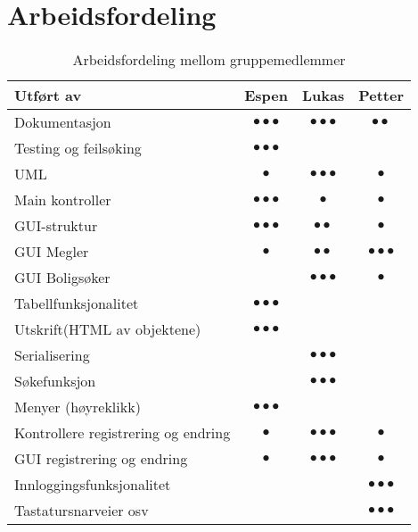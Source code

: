 \section{Arbeidsfordeling}

\begin{table}[ht!]
\center
\caption{Arbeidsfordeling mellom gruppemedlemmer}
\label{tab:arbeidsfordeling}
\begin{tabular}{|p{6.8cm}|c|c|c|}

\hline
Utført av					&Espen&Lukas	&Petter\\ \hline
Dokumentasjon				&$\bullet\bullet\bullet$&$\bullet\bullet\bullet$&$\bullet\bullet$\\	\hline
Testing og feilsøking		&$\bullet\bullet\bullet$&&\\ \hline
UML							&$\bullet$&$\bullet\bullet\bullet$&$\bullet$\\ \hline
Main kontroller				&$\bullet\bullet\bullet$&$\bullet$&$\bullet$\\ \hline
GUI-struktur					&$\bullet\bullet\bullet$&$\bullet\bullet$&$\bullet$\\ \hline
GUI Megler					&$\bullet$&$\bullet\bullet$&$\bullet\bullet\bullet$\\ \hline
GUI Boligsøker				&&$\bullet\bullet\bullet$&$\bullet$\\ \hline
Tabellfunksjonalitet			&$\bullet\bullet\bullet$&&\\ \hline
Utskrift(HTML av objektene)	&$\bullet\bullet\bullet$&&\\ \hline
Serialisering				&&$\bullet\bullet\bullet$&\\ \hline
Søkefunksjon					&&$\bullet\bullet\bullet$&\\ \hline
Menyer (høyreklikk)			&$\bullet\bullet\bullet$&&\\ \hline
Kontrollere registrering og endring		&$\bullet$&$\bullet\bullet\bullet$&$\bullet$\\ \hline
GUI registrering og endring		&$\bullet$&$\bullet\bullet\bullet$&$\bullet$\\ \hline
Innloggingsfunksjonalitet							&&&$\bullet\bullet\bullet$\\ \hline
Tastatursnarveier osv		&&&$\bullet\bullet\bullet$\\ \hline

\hline
\end{tabular}
\end{table}